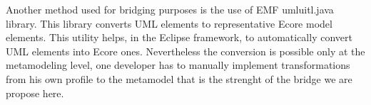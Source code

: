 Another method used for bridging purposes is the use of EMF umluitl.java library. This library converts UML elements to representative Ecore model elements. This utility helps, in the Eclipse framework, to automatically convert UML elements into Ecore ones. Nevertheless the conversion is possible only at the metamodeling level, one developer has to manually implement transformations from his own profile to the metamodel that is the strenght of the bridge we are propose here.

